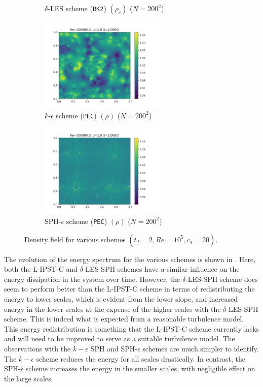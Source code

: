 \begin{figure}[htbp!]
\begin{subfigure}{7cm}
  \caption{$\delta$-LES scheme (\texttt{RK2}) $(\rho_c)$ ($N=200^2$)}
  \end{subfigure}
  \begin{subfigure}{7cm}
  \centering\includegraphics[width=6cm]{Code-Figures/long-tgv/c0_20_tait_hdx_2_pec_dtmul_1_no_n_o_files_50_nx_200_pst_10_re_100000_k_eps_tf_2/final_rho.png}
  \caption{$k$-$\epsilon$ scheme (\texttt{PEC}) $(\rho)$ ($N=200^2$)}
  \end{subfigure}
  \begin{subfigure}{7cm}
  \centering\includegraphics[width=6cm]{Code-Figures/long-tgv/c0_20_tait_hdx_2_pec_dtmul_1_mon2017_eps_0.5_no_n_o_files_50_nx_200_pst_10_re_100000_mon2017_tf_2/final_rho.png}
  \caption{SPH-$\epsilon$ scheme (\texttt{PEC}) $(\rho)$ ($N=200^2$)}
  \end{subfigure}
  \caption{Density field for various schemes $(t_f=2, Re=10^5, c_s=20)$.}
  \label{fig:ltgv-scheme-density}
\end{figure}


The evolution of the energy spectrum for the various schemes is shown in .
Here, both the L-IPST-C and $\delta$-LES-SPH schemes have a similar influence on the energy dissipation in the system over time. However, the $\delta$-LES-SPH scheme does seem to perform better than the L-IPST-C scheme in terms of redistributing the energy to lower scales, which is evident from the lower slope, and increased energy in the lower scales at the expense of the higher scales with the $\delta$-LES-SPH scheme. This is indeed what is expected from a reasonable turbulence model. This energy redistribution is something that the L-IPST-C scheme currently lacks and will need to be improved to serve as a suitable turbulence model.
The observations with the $k-\epsilon$ SPH and SPH-$\epsilon$ schemes are much simpler to identify. The $k-\epsilon$ scheme reduces the energy for all scales drastically. In contrast, the SPH-$\epsilon$ scheme increases the energy in the smaller scales, with negligible effect on the large scales.

